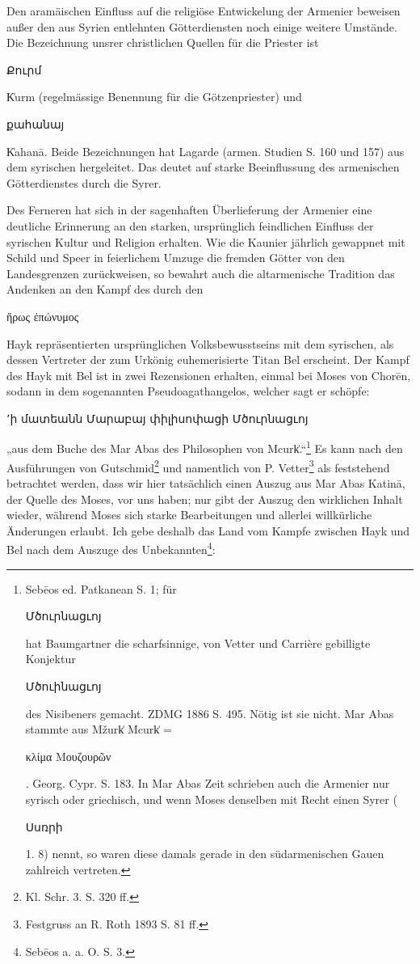 \documentclass{article}
\begin{document}
Den aramäischen Einfluss auf die religiöse Entwickelung der Armenier beweisen außer den aus Syrien entlehnten Götterdiensten noch einige weitere Umstände. Die Bezeichnung unsrer christlichen Quellen für die Priester ist \begin{armenian}Քուրմ\end{armenian} K͑urm (regelmässige Benennung für die Götzenpriester) und \begin{armenian}քահանայ\end{armenian} K͑ahanā. Beide Bezeichnungen hat Lagarde (armen. Studien S. 160 und 157) aus dem syrischen hergeleitet. Das deutet auf starke Beeinflussung des armenischen Götterdienstes durch die Syrer.

Des Ferneren hat sich in der sagenhaften Überlieferung der Armenier eine deutliche Erinnerung an den starken, ursprünglich feindlichen Einfluss der syrischen Kultur und Religion erhalten. Wie die Kaunier jährlich gewappnet mit Schild und Speer in feierlichem Umzuge die fremden Götter von den Landesgrenzen zurückweisen, so bewahrt auch die altarmenische Tradition das Andenken an den Kampf des durch den \begin{greek}ἥρως ἐπώνυμος\end{greek} Hayk repräsentierten ursprünglichen Volksbewusstseins mit dem syrischen, als dessen Vertreter der zum Urkönig euhemerisierte Titan Bel erscheint. Der Kampf des Hayk mit Bel ist in zwei Rezensionen erhalten, einmal bei Moses von Chorēn, sodann in dem sogenannten Pseudoagathangelos, welcher sagt er schöpfe: \begin{armenian}՚ի մատեանն Մարաբայ փիլիսոփացի Մծուրնացւոյ\end{armenian} „aus dem Buche des Mar Abas des Philosophen von Mcurk͑.“\footnote{Sebēos ed. Patkanean S. 1; für \begin{armenian}Մծուրնացւոյ\end{armenian} hat Baumgartner die scharfsinnige, von Vetter und Carrière gebilligte Konjektur \begin{armenian}Մծուինացւոյ\end{armenian} des Nisibeners gemacht. ZDMG 1886 S. 495. Nötig ist sie nicht. Mar Abas stammte aus Mžurk͑ Mcurk͑ = \begin{greek}κλίμα Μουζουρῶν\end{greek}. Georg. Cypr. S. 183. In Mar Abas Zeit schrieben auch die Armenier nur syrisch oder griechisch, und wenn Moses denselben mit Recht einen Syrer (\begin{armenian}Սսռրի\end{armenian} 1. 8) nennt, so waren diese damals gerade in den südarmenischen Gauen zahlreich vertreten.} Es kann nach den Ausführungen von Gutschmid\footnote{Kl. Schr. 3. S. 320 ff.} und namentlich von P. Vetter\footnote{Festgruss an R. Roth 1893 S. 81 ff.} als feststehend betrachtet werden, dass wir hier tatsächlich einen Auszug aus Mar Abas Katinā, der Quelle des Moses, vor uns haben; nur gibt der Auszug den wirklichen Inhalt wieder, während Moses sich starke Bearbeitungen und allerlei willkürliche Änderungen erlaubt. Ich gebe deshalb das Land vom Kampfe zwischen Hayk und Bel nach dem Auszuge des Unbekannten\footnote{Sebēos a. a. O. S. 3.}:
\end{document}
